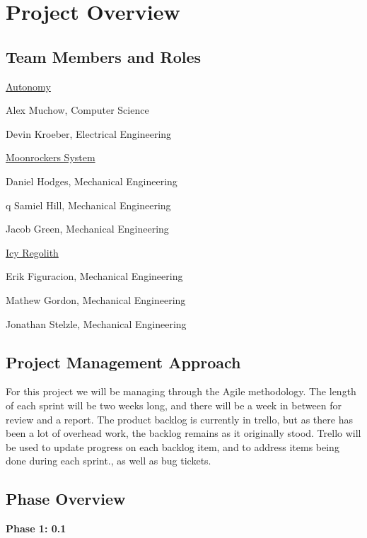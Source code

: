 

\chapter{Project Overview}







\section{Team Members and Roles}
\hspace{5 mm}\underline{Autonomy}


Alex Muchow, Computer Science


Devin Kroeber, Electrical Engineering
\vspace{5 mm}


\underline{Moonrockers System}


Daniel Hodges, Mechanical Engineering

q
Samiel Hill, Mechanical Engineering


Jacob Green, Mechanical Engineering

\vspace{5 mm}
\underline{Icy Regolith}


Erik Figuracion, Mechanical Engineering


Mathew Gordon, Mechanical Engineering


Jonathan Stelzle, Mechanical Engineering



\section{Project  Management Approach}
For this project we will be managing through the Agile methodology. The length of each sprint will be two weeks long, and there will be a week in between for review and a report. The product backlog is currently in trello, but as there has been a lot of overhead work, the backlog remains as it originally stood. Trello will be used to update progress on each backlog item, and to address items being done during each sprint., as well as bug tickets.

\section{Phase  Overview}

	\vspace{\baselineskip}
	\textbf{Phase 1: 0.1}

